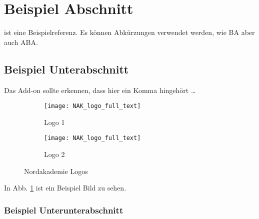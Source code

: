 \section{Beispiel Abschnitt}
\cite{latex_companion} ist eine Beispielreferenz.
Es können Abkürzungen verwendet werden, wie \ac{BA} aber auch \ac{ABA}.

\subsection{Beispiel Unterabschnitt}

Das Add-on sollte erkennen, dass hier ein Komma hingehört \ldots

\begin{figure}[h]
    \centering

    \begin{subfigure}{.4\textwidth}
        \centering
        \texttt{[image: NAK\_logo\_full\_text]}
        \caption{Logo 1}
        \label{fig:subfig1}
    \end{subfigure}
    \begin{subfigure}{.4\textwidth}
        \centering
        \texttt{[image: NAK\_logo\_full\_text]}
        \caption{Logo 2}
        \label{fig:subfig2}
    \end{subfigure}

    \caption{Nordakademie Logos}
    \label{fig:fig}
\end{figure}

In Abb. \ref{fig:subfig1} ist ein Beispiel Bild zu sehen.

\subsubsection{Beispiel Unterunterabschnitt}

\Blindtext{}
